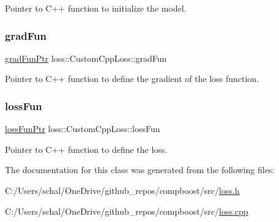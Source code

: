 Pointer to {\ttfamily C++} function to initialize the model. 

\mbox{\label{classloss_1_1_custom_cpp_loss_ad4e80f74715af8955786bf6f5766f24b}} 
\subsubsection{\texorpdfstring{grad\+Fun}{gradFun}}
{\footnotesize\ttfamily \mbox{\hyperlink{namespaceloss_acae0785d794ff7cc1b1242bab23f81c6}{grad\+Fun\+Ptr}} loss\+::\+Custom\+Cpp\+Loss\+::grad\+Fun\hspace{0.3cm}{\ttfamily [private]}}



Pointer to {\ttfamily C++} function to define the gradient of the loss function. 

\mbox{\label{classloss_1_1_custom_cpp_loss_a4745649d71fc6e428f68b2cbc9e343b7}} 
\subsubsection{\texorpdfstring{loss\+Fun}{lossFun}}
{\footnotesize\ttfamily \mbox{\hyperlink{namespaceloss_a6658cb84c8687d6dd0904c00801542f3}{loss\+Fun\+Ptr}} loss\+::\+Custom\+Cpp\+Loss\+::loss\+Fun\hspace{0.3cm}{\ttfamily [private]}}



Pointer to {\ttfamily C++} function to define the loss. 



The documentation for this class was generated from the following files\+:\begin{DoxyCompactItemize}
\item 
C\+:/\+Users/schal/\+One\+Drive/github\+\_\+repos/compboost/src/\mbox{\hyperlink{loss_8h}{loss.\+h}}\item 
C\+:/\+Users/schal/\+One\+Drive/github\+\_\+repos/compboost/src/\mbox{\hyperlink{loss_8cpp}{loss.\+cpp}}\end{DoxyCompactItemize}
